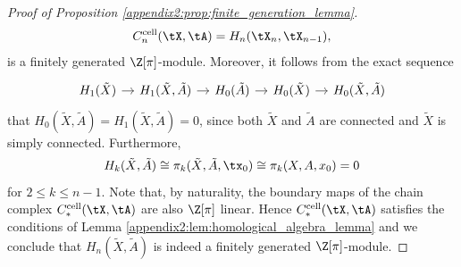 \begin{proof}[Proof of Proposition \ref{appendix2:prop:finite_generation_lemma}]
    \[
    C_n^\mathrm{cell}(\tX,\tA) = H_n(\tX_{n},\tX_{n-1}),
    \]
    is a finitely generated $\Z[\pi]$-module. Moreover, it follows from the exact sequence
    \[\begin{tikzcd}[column sep = 1em]
	{H_1(\tilde{X})} & {H_1(\tilde{X}, \tilde{A})} & {H_0(\tilde{A})} & {H_0(\tilde{X})} & {H_0(\tilde{X}, \tilde{A})}
	\arrow[from=1-1, to=1-2]
	\arrow[from=1-2, to=1-3]
	\arrow[from=1-3, to=1-4]
	\arrow[from=1-4, to=1-5]
\end{tikzcd}\]
that $H_0(\tilde{X}, \tilde{A}) = H_1(\tilde{X}, \tilde{A}) = 0$, since both $\tilde{X}$ and $\tilde{A}$ are connected and $\tilde{X}$ is simply connected. Furthermore, 
\[
H_k(\tilde{X}, \tilde{A}) \cong \pi_k(\tilde{X}, \tilde{A}, \tx_0) \cong \pi_k(X,A,x_0) = 0
\]
for $2 \leq k \leq n-1$. Note that, by naturality, the boundary maps of the chain complex $C_\ast^\mathrm{cell}(\tX,\tA)$ are also $\Z[\pi]$ linear. Hence $C_\ast^\mathrm{cell}(\tX,\tA)$ satisfies the conditions of Lemma \ref{appendix2:lem:homological_algebra_lemma} and we conclude that $H_n(\tilde{X}, \tilde{A})$ is indeed a finitely generated $\Z[\pi]$-module.
\end{proof}